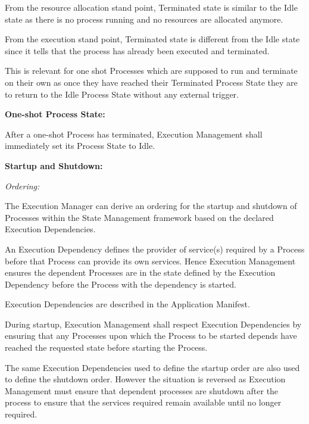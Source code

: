 \begin{DoxyItemize}
\begin{DoxyItemize}
\begin{DoxyItemize}
\item From the resource allocation stand point, Terminated state is similar to the Idle state as there is no process running and no resources are allocated anymore.
\item From the execution stand point, Terminated state is different from the Idle state since it tells that the process has already been executed and terminated.
\item This is relevant for one shot Processes which are supposed to run and terminate on their own as once they have reached their Terminated Process State they are to return to the Idle Process State without any external trigger.
\end{DoxyItemize}
\item {\bfseries One-\/shot Process State\+:}
\begin{DoxyItemize}
\item After a one-\/shot Process has terminated, Execution Management shall immediately set its Process State to Idle. 
\end{DoxyItemize}
\end{DoxyItemize}
\item {\bfseries Startup and Shutdown\+:}
\begin{DoxyItemize}
\item {\itshape Ordering\+:}
\begin{DoxyItemize}
\item The Execution Manager can derive an ordering for the startup and shutdown of Processes within the State Management framework based on the declared Execution Dependencies.
\item An Execution Dependency defines the provider of service(s) required by a Process before that Process can provide its own services. Hence Execution Management ensures the dependent Processes are in the state defined by the Execution Dependency before the Process with the dependency is started.
\item Execution Dependencies are described in the Application Manifest.
\item During startup, Execution Management shall respect Execution Dependencies by ensuring that any Processes upon which the Process to be started depends have reached the requested state before starting the Process.
\item The same Execution Dependencies used to define the startup order are also used to define the shutdown order. However the situation is reversed as Execution Management must ensure that dependent processes are shutdown after the process to ensure that the services required remain available until no longer required.

\end{DoxyItemize}
\end{DoxyItemize}
\end{DoxyItemize}

